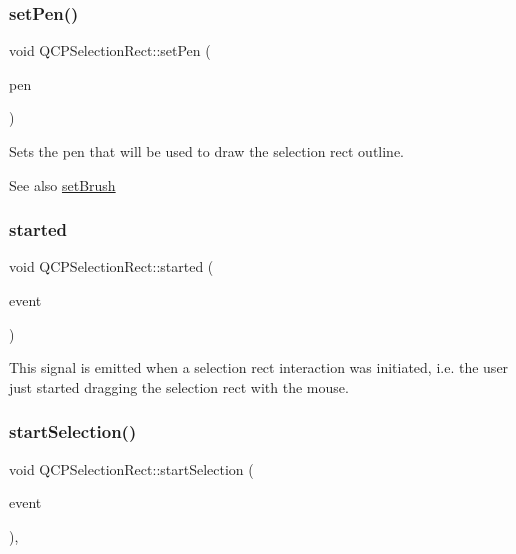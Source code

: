 \subsubsection{\texorpdfstring{setPen()}{setPen()}}
{\footnotesize\ttfamily void Q\+C\+P\+Selection\+Rect\+::set\+Pen (\begin{DoxyParamCaption}\item[{const Q\+Pen \&}]{pen }\end{DoxyParamCaption})}

Sets the pen that will be used to draw the selection rect outline.

\begin{DoxySeeAlso}{See also}
\mbox{\hyperlink{class_q_c_p_selection_rect_ab0c66f1484418782efa01f4153611080}{set\+Brush}} 
\end{DoxySeeAlso}
\mbox{\label{class_q_c_p_selection_rect_a7b7162d19f4f2174d3644ff1a5d335aa}} 
\subsubsection{\texorpdfstring{started}{started}}
{\footnotesize\ttfamily void Q\+C\+P\+Selection\+Rect\+::started (\begin{DoxyParamCaption}\item[{Q\+Mouse\+Event $\ast$}]{event }\end{DoxyParamCaption})\hspace{0.3cm}{\ttfamily [signal]}}

This signal is emitted when a selection rect interaction was initiated, i.\+e. the user just started dragging the selection rect with the mouse. \mbox{\label{class_q_c_p_selection_rect_a271f24cfca8bc50a0e2b4310ff90e227}} 
\subsubsection{\texorpdfstring{startSelection()}{startSelection()}}
{\footnotesize\ttfamily void Q\+C\+P\+Selection\+Rect\+::start\+Selection (\begin{DoxyParamCaption}\item[{Q\+Mouse\+Event $\ast$}]{event }\end{DoxyParamCaption})\hspace{0.3cm}{\ttfamily [protected]}, {\ttfamily [virtual]}}



